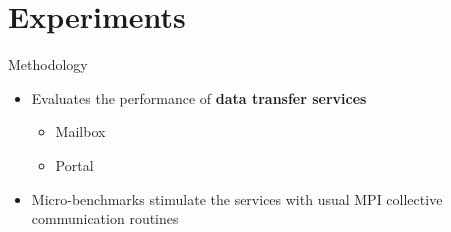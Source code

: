 \section{Experiments}

	\begin{frame}[fragile]{Methodology}
		\begin{itemize}
			\item Evaluates the performance of \textbf{data transfer services}
			\begin{itemize}
				\item Mailbox
				\item Portal
			\end{itemize}
			\item Micro-benchmarks stimulate the services with usual MPI collective communication routines
		\end{itemize}

	\end{frame}

